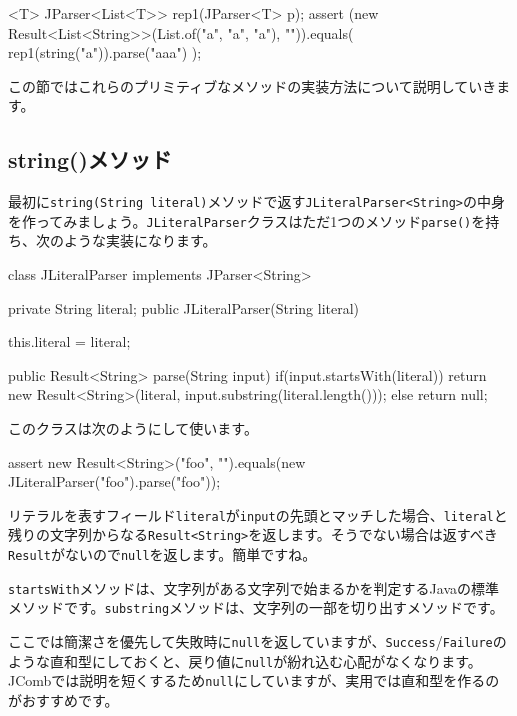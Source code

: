 \begin{codescreen}{}
<T> JParser<List<T>> rep1(JParser<T> p);
assert (new Result<List<String>>(List.of("a", "a", "a"), "")).equals(
  rep1(string("a")).parse("aaa")
);
\end{codescreen}

この節ではこれらのプリミティブなメソッドの実装方法について説明していきます。

\subsection{string()メソッド}

最初に\texttt{string(String\ literal)}メソッドで返す\texttt{JLiteralParser\textless{}String\textgreater{}}の中身を作ってみましょう。\texttt{JLiteralParser}クラスはただ1つのメソッド\texttt{parse()}を持ち、次のような実装になります。

\begin{codescreen}{}
class JLiteralParser implements JParser<String> {
  private String literal;
  public JLiteralParser(String literal) {
    this.literal = literal;

  }
  public Result<String> parse(String input) {
    if(input.startsWith(literal)) {
      return new Result<String>(literal, input.substring(literal.length()));
    } else {
      return null;
    }
  }
}
\end{codescreen}

このクラスは次のようにして使います。

\begin{codescreen}{}
assert new Result<String>("foo", "").equals(new JLiteralParser("foo").parse("foo"));
\end{codescreen}

リテラルを表すフィールド\texttt{literal}が\texttt{input}の先頭とマッチした場合、\texttt{literal}と残りの文字列からなる\texttt{Result\textless{}String\textgreater{}}を返します。そうでない場合は返すべき\texttt{Result}がないので\texttt{null}を返します。簡単ですね。

\texttt{startsWith}メソッドは、文字列がある文字列で始まるかを判定するJavaの標準メソッドです。\texttt{substring}メソッドは、文字列の一部を切り出すメソッドです。

ここでは簡潔さを優先して失敗時に\texttt{null}を返していますが、\texttt{Success}/\texttt{Failure}のような直和型にしておくと、戻り値に\texttt{null}が紛れ込む心配がなくなります。JCombでは説明を短くするため\texttt{null}にしていますが、実用では直和型を作るのがおすすめです。

